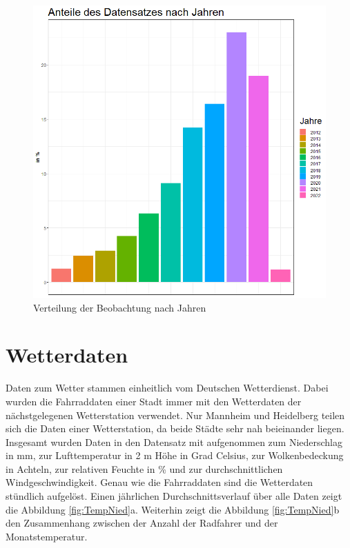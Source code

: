 \documentclass[a4paper,12pt]{thesis}
\begin{document}
\begin{figure}[!ht]
	\centering
	\includegraphics[width=\textwidth]{Plots/plot28.png}
	\caption{Verteilung der Beobachtung nach Jahren}
	\label{Jahre}
\end{figure}

\section{Wetterdaten}

Daten zum Wetter stammen einheitlich vom Deutschen Wetterdienst. Dabei wurden die Fahrraddaten einer Stadt immer mit den Wetterdaten der nächstgelegenen Wetterstation verwendet. Nur Mannheim und Heidelberg teilen sich die Daten einer Wetterstation, da beide Städte sehr nah beieinander liegen. Insgesamt wurden Daten in den Datensatz mit aufgenommen zum Niederschlag in mm, zur Lufttemperatur in 2 m Höhe in Grad Celsius, zur Wolkenbedeckung in Achteln, zur relativen Feuchte in \% und zur durchschnittlichen Windgeschwindigkeit. Genau wie die Fahrraddaten sind die Wetterdaten stündlich aufgelöst. Einen jährlichen Durchschnittsverlauf über alle Daten zeigt die Abbildung \ref{fig:TempNied}a. Weiterhin zeigt die Abbildung \ref{fig:TempNied}b den Zusammenhang zwischen der Anzahl der Radfahrer und der Monatstemperatur.
\end{document}
